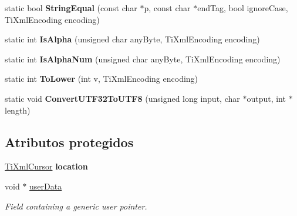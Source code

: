 \begin{DoxyCompactItemize}
\item 
\hypertarget{class_ti_xml_base_a51631e6986179558b9e5850723ed165a}{static bool {\bfseries String\-Equal} (const char $\ast$p, const char $\ast$end\-Tag, bool ignore\-Case, Ti\-Xml\-Encoding encoding)}\label{class_ti_xml_base_a51631e6986179558b9e5850723ed165a}

\item 
\hypertarget{class_ti_xml_base_ae22522b2e8e1ac43102d16394f639fc8}{static int {\bfseries Is\-Alpha} (unsigned char any\-Byte, Ti\-Xml\-Encoding encoding)}\label{class_ti_xml_base_ae22522b2e8e1ac43102d16394f639fc8}

\item 
\hypertarget{class_ti_xml_base_a321919055c115c78ded17f85a793f368}{static int {\bfseries Is\-Alpha\-Num} (unsigned char any\-Byte, Ti\-Xml\-Encoding encoding)}\label{class_ti_xml_base_a321919055c115c78ded17f85a793f368}

\item 
\hypertarget{class_ti_xml_base_a799f17405a86a5c2029618e85f11a097}{static int {\bfseries To\-Lower} (int v, Ti\-Xml\-Encoding encoding)}\label{class_ti_xml_base_a799f17405a86a5c2029618e85f11a097}

\item 
\hypertarget{class_ti_xml_base_a07c765e3a7f979d343e646ea797b180b}{static void {\bfseries Convert\-U\-T\-F32\-To\-U\-T\-F8} (unsigned long input, char $\ast$output, int $\ast$length)}\label{class_ti_xml_base_a07c765e3a7f979d343e646ea797b180b}

\end{DoxyCompactItemize}
\subsection*{Atributos protegidos}
\begin{DoxyCompactItemize}
\item 
\hypertarget{class_ti_xml_base_a0d992580f3bc264909f898e942677a3c}{\hyperlink{struct_ti_xml_cursor}{Ti\-Xml\-Cursor} {\bfseries location}}\label{class_ti_xml_base_a0d992580f3bc264909f898e942677a3c}

\item 
\hypertarget{class_ti_xml_base_ab242c01590191f644569fa89a080d97c}{void $\ast$ \hyperlink{class_ti_xml_base_ab242c01590191f644569fa89a080d97c}{user\-Data}}\label{class_ti_xml_base_ab242c01590191f644569fa89a080d97c}

\begin{DoxyCompactList}\small\item\em Field containing a generic user pointer. \end{DoxyCompactList}\end{DoxyCompactItemize}
